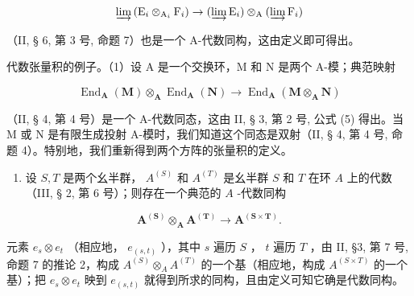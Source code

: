 \[
\varinjlim \left(\mathrm{E} _ {i} \otimes_ {\mathrm{A} _ {i}} \mathrm{F} _ {i}\right)\rightarrow (\varinjlim \mathrm{E} _ {i}) \otimes_ {\mathrm{A}} (\varinjlim \mathrm{F} _ {i})
\]

（II, § 6, 第 3 号, 命题 7）也是一个 A-代数同构，这由定义即可得出。

代数张量积的例子。（1）设 A 是一个交换环，M 和 N 是两个 A-模；典范映射

\[
\operatorname{End} _ {\mathbf {A}} (\mathbf {M}) \otimes_ {\mathbf {A}} \operatorname{End} _ {\mathbf {A}} (\mathbf {N}) \rightarrow \operatorname{End} _ {\mathbf {A}} (\mathbf {M} \otimes_ {\mathbf {A}} \mathbf {N})\tag{2}
\]

（II, § 4, 第 4 号）是一个 A-代数同态，这由 II, § 3, 第 2 号, 公式 (5) 得出。当 M 或 N 是有限生成投射 A-模时，我们知道这个同态是双射（II, § 4, 第 4 号, 命题 4）。特别地，我们重新得到两个方阵的张量积的定义。

\begin{enumerate}
\def\labelenumi{(\arabic{enumi})}
\setcounter{enumi}{1}
\tightlist
\item
  设 \(S, T\) 是两个幺半群， \(A^{(S)}\) 和 \(A^{(T)}\) 是幺半群 \(S\) 和 \(T\) 在环 \(A\) 上的代数（III, § 2, 第 6 号）；则存在一个典范的 \(A\) -代数同构
\end{enumerate}

\[
\mathbf {A} ^ {(\mathbf {S})} \otimes_ {\mathbf {A}} \mathbf {A} ^ {(\mathbf {T})} \rightarrow \mathbf {A} ^ {(\mathbf {S} \times \mathbf {T})}.\tag{3}
\]

元素 \(e_s \otimes e_t\) （相应地， \(e_{(s,t)}\) ），其中 \(s\) 遍历 \(S\) ， \(t\) 遍历 \(T\) ，由 II, §3, 第 7 号, 命题 7 的推论 2，构成 \(A^{(S)} \otimes_A A^{(T)}\) 的一个基（相应地，构成 \(A^{(S \times T)}\) 的一个基）；把 \(e_s \otimes e_t\) 映到 \(e_{(s,t)}\) 就得到所求的同构，且由定义可知它确是代数同构。

